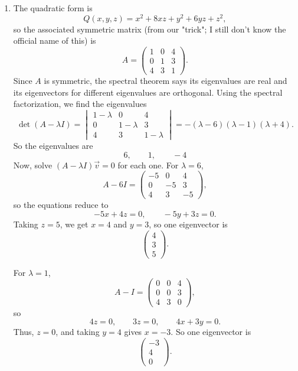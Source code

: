 \documentclass[10pt]{extarticle}
\begin{document}
\begin{enumerate}[label=(\alph*)]
\item The quadratic form is
\[
Q(x,y,z)=x^2+8xz+y^2+6yz+z^2,
\]
so the associated symmetric matrix (from our "trick"; I still don't know the official name of this) is
\[
A=
\begin{pmatrix}
1 & 0 & 4\\
0 & 1 & 3\\
4 & 3 & 1
\end{pmatrix}.
\]
Since $A$ is symmetric, the spectral theorem says its eigenvalues are real and its eigenvectors for different eigenvalues are orthogonal. Using the spectral factorization, we find the eigenvalues
\[
\det(A-\lambda I)=
\begin{vmatrix}
1-\lambda & 0 & 4\\
0 & 1-\lambda & 3\\
4 & 3 & 1-\lambda
\end{vmatrix}
=-(\lambda-6)(\lambda-1)(\lambda+4).
\]
So the eigenvalues are
\[
6,\qquad 1,\qquad -4
\]
Now, solve $(A-\lambda I)\vec{v}=0$ for each one. For $\lambda=6$,
\[
A-6I=
\begin{pmatrix}
-5 & 0 & 4\\
0 & -5 & 3\\
4 & 3 & -5
\end{pmatrix},
\]
so the equations reduce to
\[
-5x+4z=0,
\qquad
-5y+3z=0.
\]
Taking $z=5$, we get $x=4$ and $y=3$, so one eigenvector is
\[
\begin{pmatrix}
4\\3\\5
\end{pmatrix}.
\]

For $\lambda=1$,
\[
A-I=
\begin{pmatrix}
0 & 0 & 4\\
0 & 0 & 3\\
4 & 3 & 0
\end{pmatrix},
\]
so
\[
4z=0,\qquad 3z=0,\qquad 4x+3y=0.
\]
Thus, $z=0$, and taking $y=4$ gives $x=-3$. So one eigenvector is
\[
\begin{pmatrix}
-3\\4\\0
\end{pmatrix}.
\]


\end{enumerate}
\end{document}

